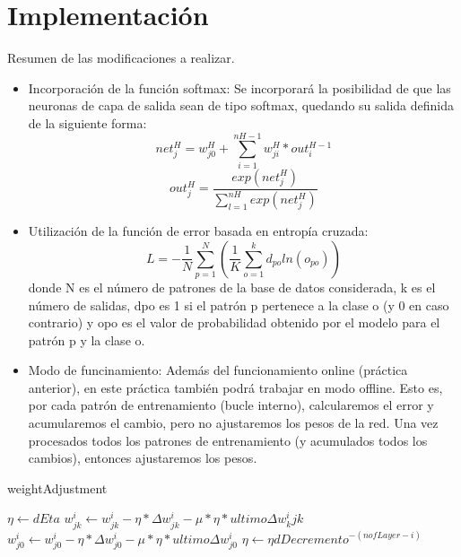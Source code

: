 \section{Implementación}
Resumen de las modificaciones a realizar.
\begin{itemize}
\item Incorporación de la función softmax: Se incorporará la posibilidad de que las neuronas de capa de salida sean de tipo softmax, quedando su salida definida de la siguiente forma:
\begin{equation}
net^H_j = w^H_{j0} + \sum^{nH-1}_{i=1} w^H_{ji} * out^{H-1}_i
\end{equation}
\begin{equation}
out^H_j = \frac{exp(net^H_j)}{\sum^{nH}_{l=1}exp(net^H_j)}
\end{equation}

\item Utilización de la función de error basada en entropía cruzada:
\begin{equation}
L = - \frac{1}{N} \sum^{N}_{p=1} \left(\frac{1}{K} \sum^k_{o=1} d_{po}ln(o_{po})\right)
\end{equation}
donde N es el número de patrones de la base de datos considerada, k es el número de salidas, dpo es 1 si el patrón p pertenece a la clase o (y 0 en caso contrario) y opo es el valor de probabilidad obtenido por el modelo para el patrón p y la clase o.

\item Modo de funcinamiento: Además del funcionamiento online (práctica anterior), en este práctica también podrá trabajar en modo offline. Esto es, por cada patrón de entrenamiento (bucle interno), calcularemos el error y acumularemos el cambio, pero no ajustaremos los pesos de la red. Una vez procesados todos los patrones de entrenamiento (y acumulados todos los cambios), entonces ajustaremos los pesos.
\end{itemize}



\begin{algorithm}[H]
\caption{weightAdjustment}
\begin{algorithmic}[1]
\STATE $\eta \leftarrow dEta$
		\STATE $w^i_{jk} \leftarrow w^i_{jk} - \eta * \Delta w^i_{jk} - \mu * \eta * ultimo \Delta w^i_k{jk}$
	\ENDFOR
		\STATE $w^i_{j0} \leftarrow w^i_{j0} - \eta * \Delta w^i_{j0} - \mu * \eta * ultimo \Delta w^i_{j0}$
\ENDFOR
\STATE $\eta \leftarrow \eta dDecremento^{-(nofLayer-i)}$
\ENDFOR
\end{algorithmic}
\end{algorithm}
